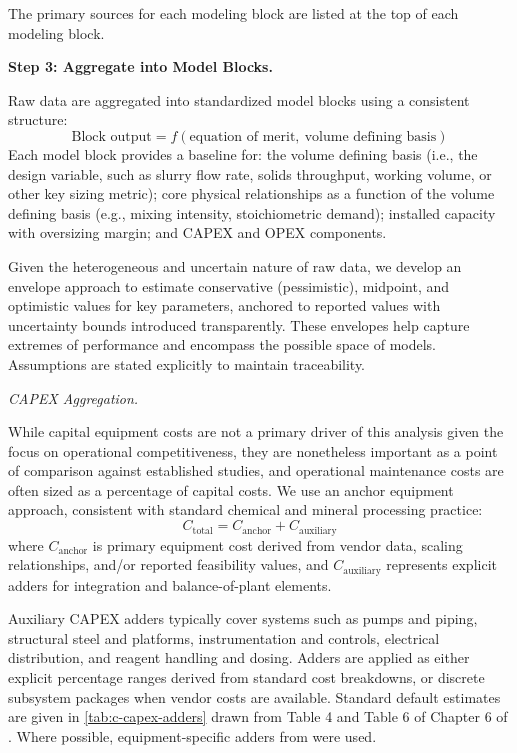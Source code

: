 \documentclass{article}
\renewcommand\_{\textunderscore\allowbreak}
\begin{document}
The primary sources for each modeling block are listed at the top of each modeling block.

\medskip
\noindent\textbf{Step 3: Aggregate into Model Blocks.}\quad

Raw data are aggregated into standardized model blocks using a consistent structure:
\begin{equation}
    \text{Block output} = f(\text{equation of merit},\ \text{volume defining basis})
\end{equation}
Each model block provides a baseline for: the volume defining basis (i.e., the design variable, such as slurry flow rate, solids throughput, working volume, or other key sizing metric); core physical relationships as a function of the volume defining basis (e.g., mixing intensity, stoichiometric demand); installed capacity with oversizing margin; and CAPEX and OPEX components.

Given the heterogeneous and uncertain nature of raw data, we develop an envelope approach to estimate conservative (pessimistic), midpoint, and optimistic values for key parameters, anchored to reported values with uncertainty bounds introduced transparently. These envelopes help capture extremes of performance and encompass the possible space of models. Assumptions are stated explicitly to maintain traceability.

\medskip
\noindent\textit{CAPEX Aggregation.}\quad

While capital equipment costs are not a primary driver of this analysis given the focus on operational competitiveness, they are nonetheless important as a point of comparison against established studies, and operational maintenance costs are often sized as a percentage of capital costs. We use an anchor equipment approach, consistent with standard chemical and mineral processing practice:
\begin{equation}
    C_{\text{total}} = C_{\text{anchor}} + C_{\text{auxiliary}}
\end{equation}
where $C_{\text{anchor}}$ is primary equipment cost derived from vendor data, scaling relationships, and/or reported feasibility values, and $C_{\text{auxiliary}}$ represents explicit adders for integration and balance-of-plant elements.

Auxiliary CAPEX adders typically cover systems such as pumps and piping, structural steel and platforms, instrumentation and controls, electrical distribution, and reagent handling and dosing. Adders are applied as either explicit percentage ranges derived from standard cost breakdowns, or discrete subsystem packages when vendor costs are available. Standard default estimates are given in \ref{tab:c-capex-adders} drawn from Table 4 and Table 6 of Chapter 6 of \citet{petersPlantDesignEconomics1991}. Where possible, equipment-specific adders from \citet{petersPlantDesignEconomics1991} were used. 
\end{document}
